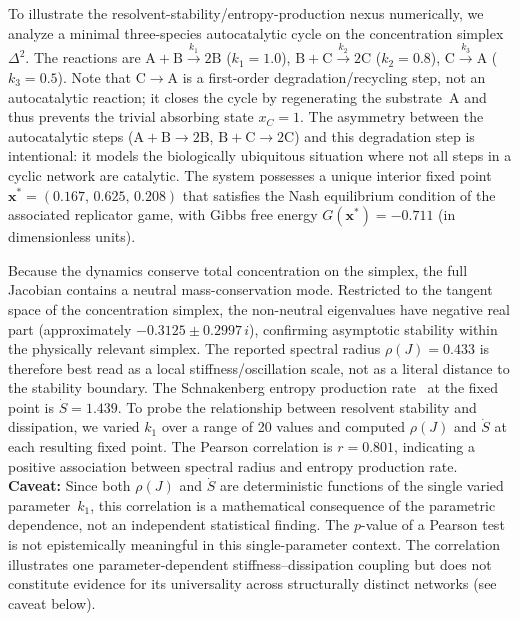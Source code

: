 \documentclass[12pt,a4paper]{article}
\theoremstyle{remark}
\begin{document}
To illustrate the resolvent-stability/entropy-production nexus numerically, we analyze a minimal three-species autocatalytic cycle on the concentration simplex $\Delta^2$.
The reactions are $\mathrm{A}+\mathrm{B}\xrightarrow{k_1}2\mathrm{B}$ ($k_1=1.0$), $\mathrm{B}+\mathrm{C}\xrightarrow{k_2}2\mathrm{C}$ ($k_2=0.8$), $\mathrm{C}\xrightarrow{k_3}\mathrm{A}$ ($k_3=0.5$).
Note that $\mathrm{C}\to\mathrm{A}$ is a first-order degradation/recycling step, not an autocatalytic reaction; it closes the cycle by regenerating the substrate~A and thus prevents the trivial absorbing state $x_C=1$. The asymmetry between the autocatalytic steps ($\mathrm{A}+\mathrm{B}\to 2\mathrm{B}$, $\mathrm{B}+\mathrm{C}\to 2\mathrm{C}$) and this degradation step is intentional: it models the biologically ubiquitous situation where not all steps in a cyclic network are catalytic.
The system possesses a unique interior fixed point $\mathbf{x}^*=(0.167,\,0.625,\,0.208)$ that satisfies the Nash equilibrium condition of the associated replicator game, with Gibbs free energy $G(\mathbf{x}^*)=-0.711$ (in dimensionless units).

Because the dynamics conserve total concentration on the simplex, the full Jacobian contains a neutral mass-conservation mode. Restricted to the tangent space of the concentration simplex, the non-neutral eigenvalues have negative real part (approximately $-0.3125 \pm 0.2997\,i$), confirming asymptotic stability within the physically relevant simplex. The reported spectral radius $\rho(J) = 0.433$ is therefore best read as a local stiffness/oscillation scale, not as a literal distance to the stability boundary.
The Schnakenberg entropy production rate~\citep{Schnakenberg1976} at the fixed point is $\dot{S}=1.439$.
To probe the relationship between resolvent stability and dissipation, we varied $k_1$ over a range of 20 values and computed $\rho(J)$ and $\dot{S}$ at each resulting fixed point.
The Pearson correlation is $r=0.801$, indicating a positive association between spectral radius and entropy production rate. \textbf{Caveat:} Since both $\rho(J)$ and $\dot{S}$ are deterministic functions of the single varied parameter~$k_1$, this correlation is a mathematical consequence of the parametric dependence, not an independent statistical finding. The $p$-value of a Pearson test is not epistemically meaningful in this single-parameter context. The correlation illustrates one parameter-dependent stiffness--dissipation coupling but does not constitute evidence for its universality across structurally distinct networks (see caveat below).
\end{document}

